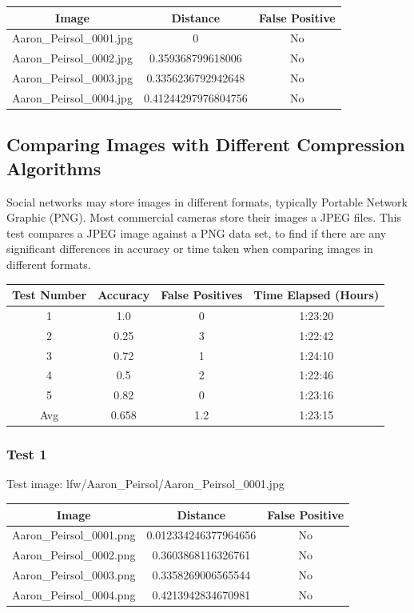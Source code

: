 \documentclass[12pt]{article}
\begin{document}
\begin{center}
\begin{tabular}{ccc}
Image & Distance & False Positive \\
\hline
Aaron\_Peirsol\_0001.jpg & 0 & No \\
Aaron\_Peirsol\_0002.jpg & 0.359368799618006 & No \\
Aaron\_Peirsol\_0003.jpg & 0.3356236792942648 & No \\
Aaron\_Peirsol\_0004.jpg & 0.41244297976804756 & No \\
\end{tabular}
\end{center}

\newpage
\subsection{Comparing Images with Different Compression Algorithms}
Social networks may store images in different formats, typically Portable Network Graphic (PNG). Most commercial cameras store their images a JPEG files. This test compares a JPEG image against a PNG data set, to find if there are any significant differences in accuracy or time taken when comparing images in different formats.

\begin{center}
\begin{tabular}{cccc}
Test Number & Accuracy & False Positives & Time Elapsed (Hours) \\
\hline
1 & 1.0 & 0 & 1:23:20\\
2 & 0.25 & 3 & 1:22:42\\
3 & 0.72 & 1 & 1:24:10\\
4 & 0.5 & 2 & 1:22:46\\
5 & 0.82 & 0 & 1:23:16\\
Avg & 0.658 & 1.2 & 1:23:15 \\ 
\end{tabular}
\end{center}

\subsubsection{Test 1}
Test image: lfw/Aaron\_Peirsol/Aaron\_Peirsol\_0001.jpg

\begin{center}
\begin{tabular}{ccc}
Image & Distance & False Positive \\
\hline
Aaron\_Peirsol\_0001.png & 0.012334246377964656 & No \\
Aaron\_Peirsol\_0002.png & 0.3603868116326761 & No \\
Aaron\_Peirsol\_0003.png & 0.3358269006565544 & No \\
Aaron\_Peirsol\_0004.png & 0.4213942834670981 & No \\
\end{tabular}
\end{center}
\end{document}
